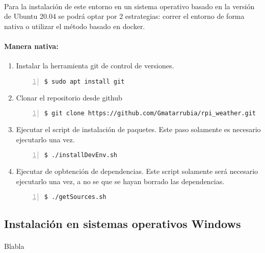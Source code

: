 \paragraph{}Para la instalación de este entorno en un sistema operativo basado en
la versión de Ubuntu 20.04 se podrá optar por 2 estrategias: correr el entorno de
forma nativa o utilizar el método basado en docker.

\paragraph{Manera nativa:}
\begin{enumerate}
    \item Instalar la herramienta \gls{git} de control de versiones.
    \begin{lstlisting}[style=consola, numbers=left]
        $ sudo apt install git
    \end{lstlisting}

    \item Clonar el repositorio desde github
    \begin{lstlisting}[style=consola, numbers=left]
        $ git clone https://github.com/Gmatarrubia/rpi_weather.git
    \end{lstlisting}

    \item Ejecutar el script de instalación de paquetes. Este paso solamente es necesario
    ejecutarlo una vez.
    \begin{lstlisting}[style=consola, numbers=left]
        $ ./installDevEnv.sh
    \end{lstlisting}

    \item Ejecutar de opbtención de dependencias. Este script solamente será necesario
    ejecutarlo una vez, a no se que se hayan borrado las dependencias.
    \begin{lstlisting}[style=consola, numbers=left]
        $ ./getSources.sh
    \end{lstlisting}

\end{enumerate}


\subsection{Instalación en sistemas operativos Windows}

\paragraph{}Blabla

